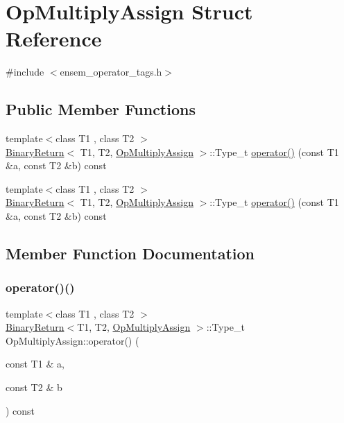 \hypertarget{structOpMultiplyAssign}{}\section{Op\+Multiply\+Assign Struct Reference}
\label{structOpMultiplyAssign}


{\ttfamily \#include $<$ensem\+\_\+operator\+\_\+tags.\+h$>$}

\subsection*{Public Member Functions}
\begin{DoxyCompactItemize}
\item 
{\footnotesize template$<$class T1 , class T2 $>$ }\\\mbox{\hyperlink{structBinaryReturn}{Binary\+Return}}$<$ T1, T2, \mbox{\hyperlink{structOpMultiplyAssign}{Op\+Multiply\+Assign}} $>$\+::Type\+\_\+t \mbox{\hyperlink{structOpMultiplyAssign_a2b6f7db01199e1f98d9c495d9f3275bb}{operator()}} (const T1 \&a, const T2 \&b) const
\item 
{\footnotesize template$<$class T1 , class T2 $>$ }\\\mbox{\hyperlink{structBinaryReturn}{Binary\+Return}}$<$ T1, T2, \mbox{\hyperlink{structOpMultiplyAssign}{Op\+Multiply\+Assign}} $>$\+::Type\+\_\+t \mbox{\hyperlink{structOpMultiplyAssign_a2b6f7db01199e1f98d9c495d9f3275bb}{operator()}} (const T1 \&a, const T2 \&b) const
\end{DoxyCompactItemize}


\subsection{Member Function Documentation}
\mbox{\label{structOpMultiplyAssign_a2b6f7db01199e1f98d9c495d9f3275bb}} 
\subsubsection{\texorpdfstring{operator()()}{operator()()}\hspace{0.1cm}{\footnotesize\ttfamily [1/2]}}
{\footnotesize\ttfamily template$<$class T1 , class T2 $>$ \\
\mbox{\hyperlink{structBinaryReturn}{Binary\+Return}}$<$T1, T2, \mbox{\hyperlink{structOpMultiplyAssign}{Op\+Multiply\+Assign}} $>$\+::Type\+\_\+t Op\+Multiply\+Assign\+::operator() (\begin{DoxyParamCaption}\item[{const T1 \&}]{a,  }\item[{const T2 \&}]{b }\end{DoxyParamCaption}) const\hspace{0.3cm}{\ttfamily [inline]}}


